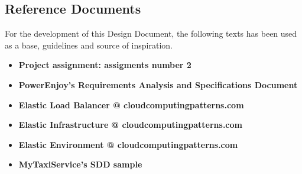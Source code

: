 \subsection{Reference Documents}

For the development of this Design Document, the following texts has been used as a base, guidelines and source of inspiration.

\begin{itemize}
	\item \textbf{Project assignment: assigments number 2}
	\item \textbf{PowerEnjoy's Requirements Analysis and Specifications Document}
	\item \textbf{Elastic Load Balancer @ cloudcomputingpatterns.com}
	\item \textbf{Elastic Infrastructure @ cloudcomputingpatterns.com}
	\item \textbf{Elastic Environment @ cloudcomputingpatterns.com}
	\item \textbf{MyTaxiService's SDD sample}
\end{itemize} 

